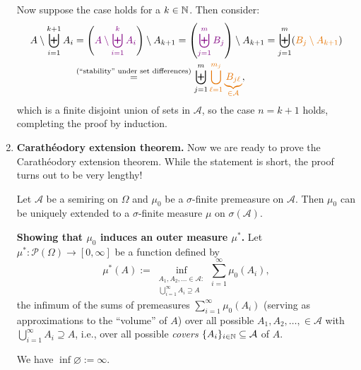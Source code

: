 \begin{enumerate}
\begin{pf}
Now suppose the case  holds for a \(k\in\mathbb{N}\). Then consider:
\begin{align*}
A\setminus \biguplus_{i=1}^{k+1}A_i
&=\left(\vc{A\setminus \biguplus_{i=1}^{k}A_i}\right)\setminus A_{k+1}
=\left(\vc{\biguplus_{j=1}^{m}B_j}\right)\setminus A_{k+1}
=\biguplus_{j=1}^{m}(\orc{B_j\setminus A_{k+1}}) \\
&\overset{\text{(``stability'' under set differences)}}{=}
\biguplus_{j=1}^{m}\orc{\bigcup_{\ell=1}^{m_j}\underbrace{B_{j\ell}}_{\in\mathcal{A}}},
\end{align*}
which is a finite disjoint union of sets in \(\mathcal{A}\), so the case
\(n=k+1\) holds, completing the proof by induction.
\end{pf}
\item \textbf{Carath\'eodory extension theorem.} Now we are ready to prove the
Carath\'eodory extension theorem. While the statement is short, the proof turns
out to be very lengthy!
\begin{theorem}
\label{thm:caratheodory}
Let \(\mathcal{A}\) be a semiring on \(\Omega\) and \(\mu_0\) be a
\(\sigma\)-finite premeasure on \(\mathcal{A}\). Then \(\mu_0\) can be uniquely
extended to a \(\sigma\)-finite measure \(\mu\) on \(\sigma(\mathcal{A})\).
\end{theorem}
\begin{pf}
\textbf{Showing that \(\mu_0\) induces an outer measure \(\mu^*\).}
Let \(\mu^*:\mathcal{P}(\Omega)\to[0,\infty]\) be a function defined by
\[
\mu^*(A):=\inf_{
\substack{A_1,A_2,\dotsc\in\mathcal{A}: \\
\bigcup_{i=1}^{\infty}A_i\supseteq A}}\sum_{i=1}^{\infty}\mu_0(A_i),
\]
the infimum of the sums of premeasures \(\sum_{i=1}^{\infty}\mu_0(A_i)\)
(serving as approximations to the ``volume'' of \(A\)) over all possible
\(A_1,A_2,\dotsc,\in\mathcal{A}\) with \(\bigcup_{i=1}^{\infty}A_i\supseteq
A\), i.e., over all possible \emph{covers} \(\{A_{i}\}_{i\in\mathbb{N}}\subseteq \mathcal{A}\) of \(A\).
\begin{note}
We have \(\inf\varnothing:=\infty\).
\end{note}
\begin{center}
\end{center}
\end{pf}
\end{enumerate}
